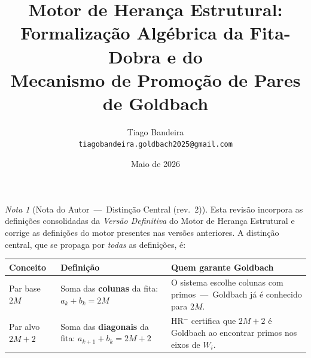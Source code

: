 \documentclass[12pt, a4paper]{article}
\title{Motor de Herança Estrutural:\\
	Formalização Algébrica da Fita-Dobra e do\\
	Mecanismo de Promoção de Pares de Goldbach}
\author{Tiago Bandeira\\
	\small\texttt{tiagobandeira.goldbach2025@gmail.com}}
\date{Maio de 2026}
\theoremstyle{plain}
\theoremstyle{definition}
\theoremstyle{remark}
\newtheorem*{note}{Nota}
\begin{document}
	
	\maketitle
	
	\begin{note}[Nota do Autor~---~Distinção Central (rev.~2)]
		Esta revisão incorpora as definições consolidadas da
		\emph{Versão Definitiva} do Motor de Herança Estrutural e corrige
		as definições do motor presentes nas versões anteriores.
		A distinção central, que se propaga por \emph{todas} as definições,
		é:
		\medskip
		\begin{center}
			\begin{tabular}{lp{5.8cm}p{5cm}}
				\toprule
				Conceito & Definição & Quem garante Goldbach\\
				\midrule
				Par base $2M$ &
				Soma das \textbf{colunas} da fita:
				$a_k+b_k=2M$ &
				O sistema escolhe colunas com primos~---~Goldbach
				já é conhecido para $2M$.\\[4pt]
				Par alvo $2M{+}2$ &
				Soma das \textbf{diagonais} da fita:
				$a_{k+1}+b_k=2M{+}2$ &
				HR$^-$ certifica que $2M{+}2$ é Goldbach ao
				encontrar primos nos eixos de $W_i$.\\
				\bottomrule
			\end{tabular}
		\end{center}
	\end{note}
	
\end{document}
